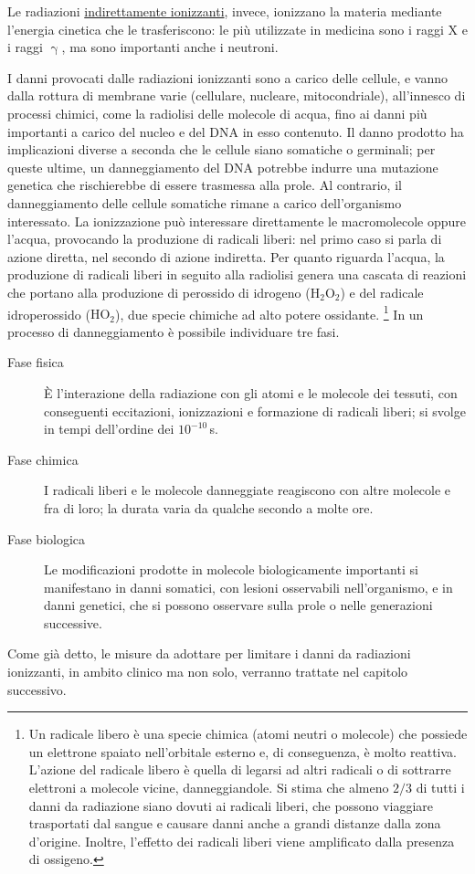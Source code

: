 \documentclass{report}
\numberwithin{equation}{section}
\numberwithin{figure}{section}
\begin{document}
Le radiazioni \underline{indirettamente ionizzanti}, invece, ionizzano la materia mediante l'energia cinetica che le trasferiscono: le più utilizzate in medicina sono i raggi X e i raggi $\upgamma$, ma sono importanti anche i neutroni.

I danni provocati dalle radiazioni ionizzanti sono a carico delle cellule, e vanno dalla rottura di membrane varie (cellulare, nucleare, mitocondriale), all'innesco di processi chimici, come la radiolisi delle molecole di acqua, fino ai danni più importanti a carico del nucleo e del DNA in esso contenuto. Il danno prodotto ha implicazioni diverse a seconda che le cellule siano somatiche o germinali; per queste ultime, un danneggiamento del DNA potrebbe indurre una mutazione genetica che rischierebbe di essere trasmessa alla prole. Al contrario, il danneggiamento delle cellule somatiche rimane a carico dell'organismo interessato. La ionizzazione può interessare direttamente le macromolecole oppure l'acqua, provocando la produzione di radicali liberi: nel primo caso si parla di azione diretta, nel secondo di azione indiretta. Per quanto riguarda l'acqua, la produzione di radicali liberi in seguito alla radiolisi genera una cascata di reazioni che portano alla produzione di perossido di idrogeno ($\mathrm{H_2O_2}$) e del radicale idroperossido ($\mathrm{HO_2}$), due specie chimiche ad alto potere ossidante.%
\footnote{Un radicale libero è una specie chimica (atomi neutri o molecole) che possiede un elettrone spaiato nell'orbitale esterno e, di conseguenza, è molto reattiva. L'azione del radicale libero è quella di legarsi ad altri radicali o di sottrarre elettroni a molecole vicine, danneggiandole. Si stima che almeno $2/3$ di tutti i danni da radiazione siano dovuti ai radicali liberi, che possono viaggiare trasportati dal sangue e causare danni anche a grandi distanze dalla zona d'origine. Inoltre, l'effetto dei radicali liberi viene amplificato dalla presenza di ossigeno.}
In un processo di danneggiamento è possibile individuare tre fasi.
\begin{description}
    \item[Fase fisica] È l'interazione della radiazione con gli atomi e le molecole dei tessuti, con conseguenti eccitazioni, ionizzazioni e formazione di radicali liberi; si svolge in tempi dell'ordine dei $10^{-10}$\,s.
    \item[Fase chimica] I radicali liberi e le molecole danneggiate reagiscono con altre molecole e fra di loro; la durata varia da qualche secondo a molte ore.
    \item[Fase biologica] Le modificazioni prodotte in molecole biologicamente importanti si manifestano in danni somatici, con lesioni osservabili nell'organismo, e in danni genetici, che si possono osservare sulla prole o nelle generazioni successive.
\end{description}
Come già detto, le misure da adottare per limitare i danni da radiazioni ionizzanti, in ambito clinico ma non solo, verranno trattate nel capitolo successivo.
\end{document}
